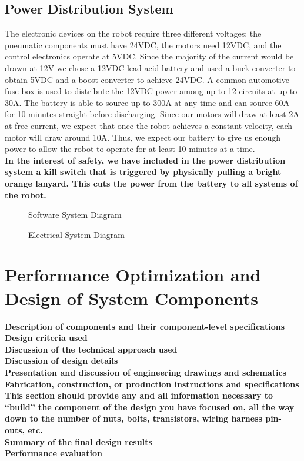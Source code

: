 \documentclass[letterpaper,12pt]{article}
\newcommand{\xxx}[1]{{\color{red}\bf #1}}
\begin{document}
\subsection{Power Distribution System}
The electronic devices on the robot require three different voltages: the
pneumatic components must have 24VDC, the motors need 12VDC, and the control
electronics operate at 5VDC. Since the majority of the current would be drawn
at 12V we chose a 12VDC lead acid battery and used a buck converter to obtain
5VDC and a boost converter to achieve 24VDC. A common automotive fuse box is
used to distribute the 12VDC power among up to 12 circuits at up to 30A. The
battery is able to source up to 300A at any time and can source 60A for 10
minutes straight before discharging. Since our motors will draw at least 2A at
free current, we expect that once the robot achieves a constant velocity, each
motor will draw around 10A. Thus, we expect our battery to give us enough power
to allow the robot to operate for at least 10 minutes at a time.\\

\xxx{In the interest of safety, we have included in the power distribution
system a kill switch that is triggered by physically pulling a bright orange
lanyard.  This cuts the power from the battery to all systems of the robot.}\\

\begin{figure}[h!]
  \centering
  
  \caption{Software System Diagram}
  \label{fig:system_diagram}
\end{figure}

\begin{figure}[h!]
  \centering
  
  \caption{Electrical System Diagram}
  \label{fig:e_system}
\end{figure}

\section{Performance Optimization and Design of System Components}
\label{sec:optimization}
\xxx{Description of components and their component-level specifications} \\
\xxx{Design criteria used} \\
\xxx{Discussion of the technical approach used} \\
\xxx{Discussion of design details} \\
\xxx{Presentation and discussion of engineering drawings and schematics} \\
\xxx{Fabrication, construction, or production instructions and specifications} \\
\xxx{This section should provide any and all information necessary to ``build'' the component of the design you have focused on, all the way down to the number of nuts, bolts, transistors, wiring harness pin-outs, etc.} \\
\xxx{Summary of the final design results} \\
\xxx{Performance evaluation}
\end{document}
